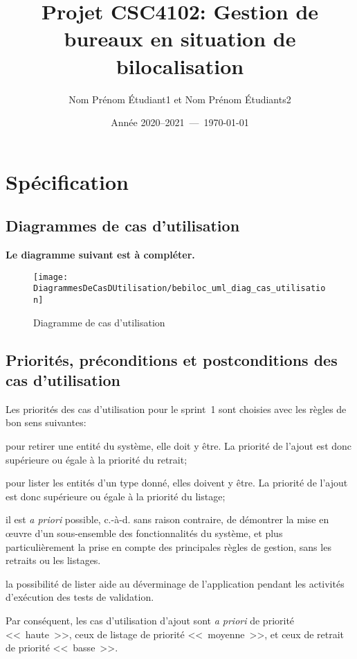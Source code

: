 \documentclass[11pt,article]{article}
\begin{document}
\title{Projet CSC4102: Gestion de bureaux en situation de bilocalisation}
\author{Nom Prénom Étudiant1 et Nom Prénom Étudiants2}
\date{Année 2020--2021~---~\today}
\maketitle

\newpage

\tableofcontents

\newpage

\section{Spécification}

\subsection{Diagrammes de cas d'utilisation}

{\color{red}\textbf{Le diagramme suivant est à compléter.}}

\begin{figure}[h!]
\begin{center}
\texttt{[image: DiagrammesDeCasDUtilisation/bebiloc\_uml\_diag\_cas\_utilisation]}
\caption{Diagramme de cas d'utilisation}
\end{center}
\label{umlet_diag_cas_utilisation}
\end{figure}

\newpage

\subsection{Priorités, préconditions et postconditions des cas d'utilisation}

Les priorités des cas d'utilisation pour le sprint~1 sont choisies
avec les règles de bon sens suivantes:
\begin{compactitem}
\item pour retirer une entité du système, elle doit y être. La
priorité de l'ajout est donc supérieure ou égale à la priorité du
retrait;
\item pour lister les entités d'un type donné, elles doivent y être. La
priorité de l'ajout est donc supérieure ou égale à la priorité du
listage;
\item il est \textit{a priori} possible, c.-à-d. sans raison
contraire, de démontrer la mise en œuvre d'un sous-ensemble des
fonctionnalités du système, et plus particulièrement la prise en
compte des principales règles de gestion, sans les retraits ou les
listages.
\item la possibilité de lister aide au déverminage de l'application
pendant les activités d'exécution des tests de validation.
\end{compactitem}
Par conséquent, les cas d'utilisation d'ajout sont \textit{a priori}
de priorité <<~haute~>>, ceux de listage de priorité
<<~moyenne~>>, et ceux de retrait de priorité <<~basse~>>.
\end{document}
